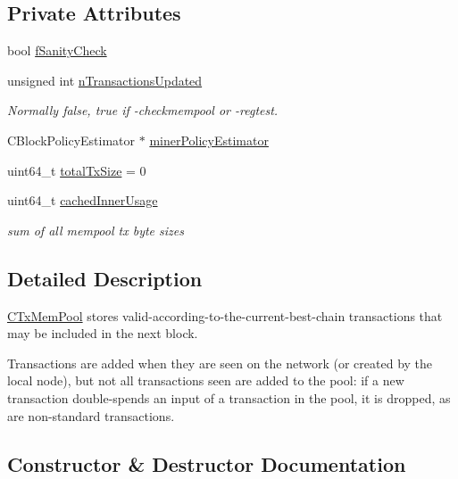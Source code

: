 \subsection*{Private Attributes}
\begin{DoxyCompactItemize}
\item 
bool \mbox{\hyperlink{class_c_tx_mem_pool_a1752e79ce537972fe87e252b9d07d2e0}{f\+Sanity\+Check}}
\item 
unsigned int \mbox{\hyperlink{class_c_tx_mem_pool_a230bbfe440e222787d8d94a1aaef73d4}{n\+Transactions\+Updated}}
\begin{DoxyCompactList}\small\item\em Normally false, true if -\/checkmempool or -\/regtest. \end{DoxyCompactList}\item 
C\+Block\+Policy\+Estimator $\ast$ \mbox{\hyperlink{class_c_tx_mem_pool_af4d48ac0d6d62e7044ba21a45709f743}{miner\+Policy\+Estimator}}
\item 
uint64\+\_\+t \mbox{\hyperlink{class_c_tx_mem_pool_ac59656df749b33e9eb667a6850f36b7b}{total\+Tx\+Size}} = 0
\item 
uint64\+\_\+t \mbox{\hyperlink{class_c_tx_mem_pool_a9cf8ed535f89c0a1332af6c15e4a2aa9}{cached\+Inner\+Usage}}
\begin{DoxyCompactList}\small\item\em sum of all mempool tx\textquotesingle{} byte sizes \end{DoxyCompactList}\end{DoxyCompactItemize}


\subsection{Detailed Description}
\mbox{\hyperlink{class_c_tx_mem_pool}{C\+Tx\+Mem\+Pool}} stores valid-\/according-\/to-\/the-\/current-\/best-\/chain transactions that may be included in the next block.

Transactions are added when they are seen on the network (or created by the local node), but not all transactions seen are added to the pool\+: if a new transaction double-\/spends an input of a transaction in the pool, it is dropped, as are non-\/standard transactions. 

\subsection{Constructor \& Destructor Documentation}
\mbox{\label{class_c_tx_mem_pool_a82147548cfa962975690d1926b717c1c}} 
